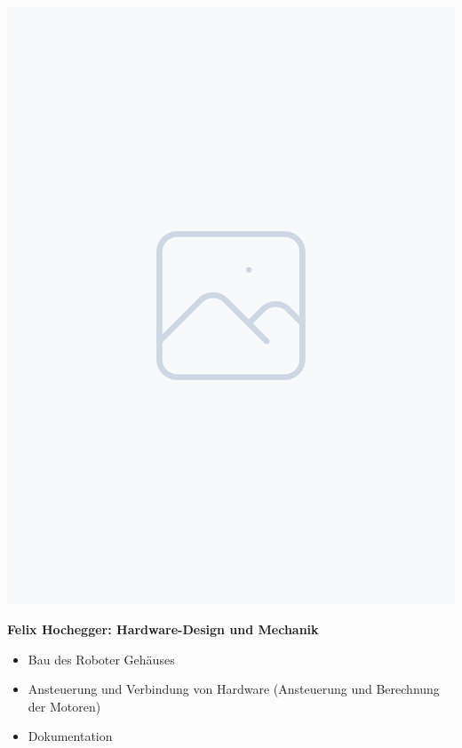 \documentclass[ngerman,12pt,a4paper]{article}
\begin{document}
\begin{center}
\begin{minipage}{0.65\textwidth}
\begin{itemize}
				\end{itemize}
			\end{minipage} \\[1cm]
			\begin{minipage}{0.2\textwidth}
				\includegraphics[width=\linewidth]{Pictures/placeholder}
				\label{fig:felix}
			\end{minipage}
			\hfill
			\begin{minipage}{0.65\textwidth}
				\vspace{-60pt}
				\textbf{Felix Hochegger: Hardware-Design und Mechanik}
				\begin{itemize}
					\item Bau des Roboter Gehäuses \vspace{-10pt}
					\item Ansteuerung und Verbindung von Hardware (Ansteuerung und Berechnung der Motoren) \vspace{-10pt}
					\item Dokumentation \vspace{-10pt}
				\end{itemize}
			\end{minipage}
			\end{center}
			\newpage
\end{document}
